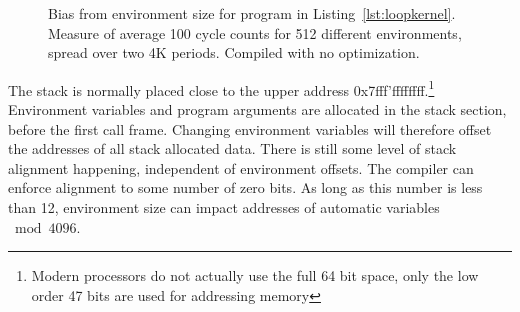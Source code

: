 \documentclass[a4paper,10pt,twocolumn,twoside]{article}
\begin{document}
\begin{figure}[t]
  \caption{Bias from environment size for program in Listing~\ref{lst:loopkernel}. Measure of average 100 cycle counts for 512 different environments, spread over two 4K periods. Compiled with no optimization.}
  \label{fig:envbias}
\end{figure}

The stack is normally placed close to the upper address 0x7fff'ffffffff.\footnote{Modern processors do not actually use the full 64 bit space, only the low order 47 bits are used for addressing memory}
Environment variables and program arguments are allocated in the stack section, before the first call frame.
Changing environment variables will therefore offset the addresses of all stack allocated data.
There is still some level of stack alignment happening, independent of environment offsets. 
The compiler can enforce alignment to some number of zero bits.
As long as this number is less than 12, environment size can impact addresses of automatic variables $\bmod 4096$.
\end{document}

